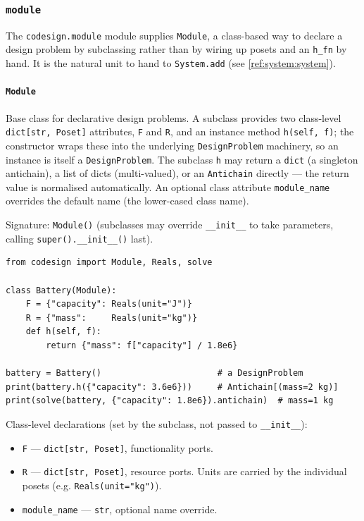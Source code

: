 \documentclass[11pt,a4paper]{article}
\begin{document}
\subsubsection{\texttt{module}}
\label{ref:module}

The \texttt{codesign.module} module supplies \texttt{Module}, a class-based
way to declare a design problem by subclassing rather than by wiring up
posets and an \texttt{h\_fn} by hand. It is the natural unit to hand to
\texttt{System.add} (see \ref{ref:system:system}).

\paragraph{\texttt{Module}}\label{ref:module:module}
Base class for declarative design problems. A subclass provides two
class-level \texttt{dict[str, Poset]} attributes, \texttt{F} and \texttt{R},
and an instance method \texttt{h(self, f)}; the constructor wraps these into
the underlying \texttt{DesignProblem} machinery, so an instance is itself a
\texttt{DesignProblem}. The subclass \texttt{h} may return a \texttt{dict}
(a singleton antichain), a list of dicts (multi-valued), or an
\texttt{Antichain} directly --- the return value is normalised
automatically. An optional class attribute \texttt{module\_name} overrides
the default name (the lower-cased class name).

Signature: \texttt{Module()} (subclasses may override \texttt{\_\_init\_\_}
to take parameters, calling \texttt{super().\_\_init\_\_()} last).

\begin{lstlisting}
from codesign import Module, Reals, solve

class Battery(Module):
    F = {"capacity": Reals(unit="J")}
    R = {"mass":     Reals(unit="kg")}
    def h(self, f):
        return {"mass": f["capacity"] / 1.8e6}

battery = Battery()                       # a DesignProblem
print(battery.h({"capacity": 3.6e6}))     # Antichain[(mass=2 kg)]
print(solve(battery, {"capacity": 1.8e6}).antichain)  # mass=1 kg
\end{lstlisting}

Class-level declarations (set by the subclass, not passed to
\texttt{\_\_init\_\_}):
\begin{itemize}[nosep]
  \item \texttt{F} --- \texttt{dict[str, Poset]}, functionality ports.
  \item \texttt{R} --- \texttt{dict[str, Poset]}, resource ports. Units are
        carried by the individual posets (e.g. \texttt{Reals(unit="kg")}).
  \item \texttt{module\_name} --- \texttt{str}, optional name override.
\end{itemize}
\end{document}
